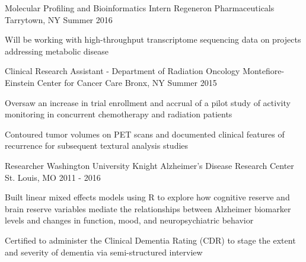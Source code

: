 

\begin{cventries}
\cventry
	{Molecular Profiling and Bioinformatics Intern}
	{Regeneron Pharmaceuticals}
	{Tarrytown, NY}
	{Summer 2016}
	{
		\begin{cvitems}
			\item{Will be working with high-throughput transcriptome sequencing data on projects addressing metabolic disease}
		\end{cvitems}
	}
	
  \cventry
    {Clinical Research Assistant - Department of Radiation Oncology} %
    {Montefiore-Einstein Center for Cancer Care} %
    {Bronx, NY} %
    {Summer 2015} %
    {
      \begin{cvitems} %
        \item {Oversaw an increase in trial enrollment and accrual of a pilot study of activity monitoring in concurrent chemotherapy and radiation patients}
        \item {Contoured tumor volumes on PET scans and documented clinical features of recurrence for subsequent textural analysis studies}
      \end{cvitems}
    }

  \cventry
    {Researcher} %
    {Washington University Knight Alzheimer's Disease Research Center} %
    {St. Louis, MO} %
    {2011 - 2016} %
    {
      \begin{cvitems} %
        \item {Built linear mixed effects models using R to explore how cognitive reserve and brain reserve variables mediate the relationships between Alzheimer biomarker levels and changes in function, mood, and neuropsychiatric behavior}
        \item {Certified to administer the Clinical Dementia Rating (CDR) to stage the extent and severity of dementia via semi-structured interview}
      \end{cvitems}
    }


\end{cventries}
